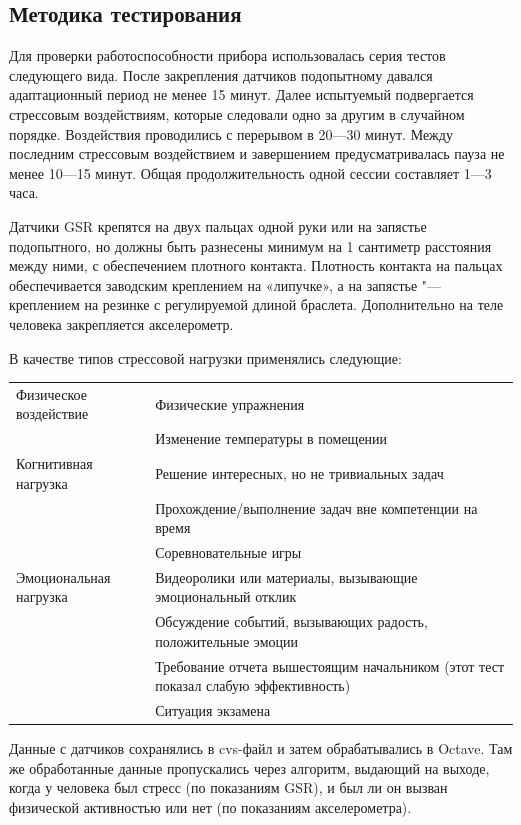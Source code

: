 \documentclass[10pt, a5paper]{article}
\begin{document}
\subsection*{Методика тестирования}

Для проверки работоспособности прибора использовалась серия тестов следующего вида. После закрепления датчиков подопытному давался адаптационный период не менее 15 минут. Далее испытуемый подвергается стрессовым воздействиям, которые следовали одно за другим в случайном порядке. Воздействия проводились с перерывом в 20—30 минут. Между последним стрессовым воздействием и завершением предусматривалась пауза не менее 10—15 минут. Общая продолжительность одной сессии составляет 1—3 часа.

Датчики GSR крепятся на двух пальцах одной руки или на запястье подопытного, но должны быть разнесены минимум на 1 сантиметр расстояния между ними, с обеспечением плотного контакта. Плотность контакта на пальцах обеспечивается заводским креплением на «липучке», а на запястье "--- креплением на резинке с регулируемой длиной браслета. Дополнительно на теле человека закрепляется акселерометр.

В качестве типов стрессовой нагрузки применялись следующие:

\begin{table}[t!]
  \centering
  \begin{tabular}{P{10em}|P{20em}}
    \hline
    Физическое воздействие & Физические упражнения \\
     & Изменение температуры в помещении \\
    \hline
    Когнитивная нагрузка & Решение интересных, но не тривиальных задач \\
     & Прохождение/выполнение задач вне компетенции на время \\
     & Соревновательные игры \\
    \hline
    Эмоциональная нагрузка & Видеоролики или материалы, вызывающие эмоциональный отклик \\
     & Обсуждение событий, вызывающих радость, положительные эмоции \\
     & Требование отчета вышестоящим начальником (этот тест показал слабую эффективность) \\
     & Ситуация экзамена \\
    \hline
  \end{tabular}
\end{table}
Данные с датчиков сохранялись в cvs-файл и затем обрабатывались в Octave. Там же обработанные данные пропускались через алгоритм, выдающий на выходе, когда у человека был стресс (по показаниям GSR), и был ли он вызван физической активностью или нет (по показаниям акселерометра).
\end{document}
